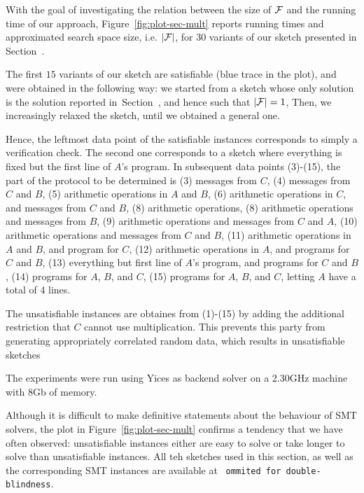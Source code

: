 \documentclass[preprint]{sig-alternate-05-2015}
\begin{document}
With the goal of investigating the 
relation between the size of ${\cal F}$
and the running time of our approach, 
Figure~\ref{fig:plot-sec-mult} reports 
running times and approximated
search space size, i.e. $|{\cal F}|$,
for $30$ variants of our sketch presented in 
Section~\label{sec:ex}.

The first $15$ variants of our sketch are satisfiable 
(blue trace in the plot),
and were obtained in the following way:
we started from a sketch whose only solution 
is the solution reported in~Section~\label{sec:ex},
and hence such that $|{\cal F}| = 1$,
Then, we increasingly relaxed the sketch,
until we obtained a general one.

Hence, the leftmost data point of the satisfiable instances corresponds to 
simply a verification check.
The second one corresponds to a sketch 
where everything is fixed but
the first line of $A$'s program.
In subsequent data points (3)-(15), the part of the protocol to be determined
is (3) messages from $C$,
(4) messages from $C$ and $B$,
(5) arithmetic operations in $A$ and $B$,
(6) arithmetic operations in $C$, and messages from $C$ and $B$,
(8) arithmetic operations,
(8) arithmetic operations and messages from $B$,
(9) arithmetic operations and messages from $C$ and $A$,
(10) arithmetic operations and messages from $C$ and $B$,
(11) arithmetic operations in $A$ and $B$, and program for $C$,
(12) arithmetic operations in $A$, and programs for $C$ and $B$,
(13) everything but first line of $A$'s program, and programs for $C$ and $B$,
(14) programs for $A$, $B$, and $C$,
(15) programs for $A$, $B$, and $C$, letting $A$ have a total of 4 lines.

The unsatisfiable instances are obtaines from (1)-(15) by adding the additional
restriction that $C$ cannot use multiplication. This prevents this
party from generating appropriately correlated random data,
which results in unsatisfiable sketches

The experiments were run using Yices as backend solver
on a 2.30GHz machine with 8Gb of memory.

Although it is difficult to make definitive statements 
about the behaviour of SMT solvers, the plot in
Figure~\ref{fig:plot-sec-mult}
confirms a tendency that we have often observed:
unsatisfiable instances 
either are easy to solve or
take longer to solve than unsatisfiable instances.
All teh sketches used in this section, as well as the 
corresponding SMT instances are available at
~\texttt{ommited for double-blindness}.
\end{document}

